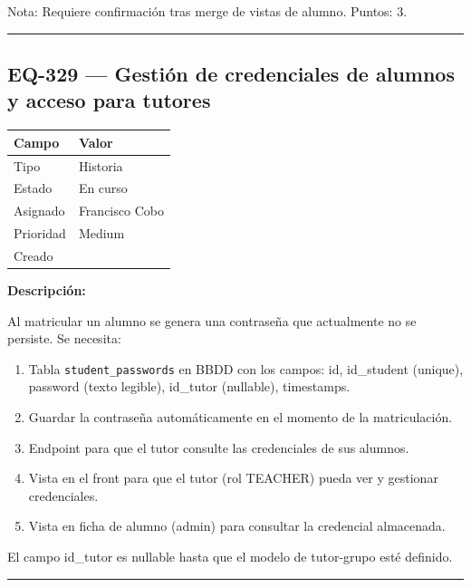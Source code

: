 \documentclass[
  spanish,
  11pt,
]{report}
\newcounter{none} %
\providecommand{\tightlist}{%
  \setlength{\itemsep}{0pt}\setlength{\parskip}{0pt}}
\begin{document}
Nota: Requiere confirmación tras merge de vistas de alumno. Puntos: 3.

\begin{center}\rule{0.5\linewidth}{0.5pt}\end{center}

\subsection{EQ-329 --- Gestión de credenciales de alumnos y acceso para
tutores}\label{eq-329-gestiuxf3n-de-credenciales-de-alumnos-y-acceso-para-tutores}

{\def\LTcaptype{none} %
\begin{longtable}[]{@{}ll@{}}
\toprule\noalign{}
Campo & Valor \\
\midrule\noalign{}
\endhead
\bottomrule\noalign{}
\endlastfoot
Tipo & Historia \\
Estado & En curso \\
Asignado & Francisco Cobo \\
Prioridad & Medium \\
Creado & \\
\end{longtable}
}

\textbf{Descripción:}

Al matricular un alumno se genera una contraseña que actualmente no se
persiste. Se necesita:

\begin{enumerate}
\def\labelenumi{\arabic{enumi}.}
\tightlist
\item
  Tabla \texttt{student\_passwords} en BBDD con los campos: id,
  id\_student (unique), password (texto legible), id\_tutor (nullable),
  timestamps.
\item
  Guardar la contraseña automáticamente en el momento de la
  matriculación.
\item
  Endpoint para que el tutor consulte las credenciales de sus alumnos.
\item
  Vista en el front para que el tutor (rol TEACHER) pueda ver y
  gestionar credenciales.
\item
  Vista en ficha de alumno (admin) para consultar la credencial
  almacenada.
\end{enumerate}

El campo id\_tutor es nullable hasta que el modelo de tutor-grupo esté
definido.

\begin{center}\rule{0.5\linewidth}{0.5pt}\end{center}
\end{document}
